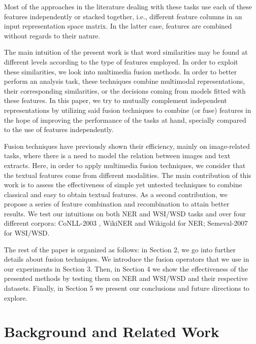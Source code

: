 \documentclass{llncs}
\begin{document}
Most of the approaches in the literature dealing with these tasks use each of these features independently or stacked together, i.e., different feature columns in an input representation space matrix. In the latter case, features are combined without regards to their nature. 

The main intuition of the present work is that word similarities may be found at different levels according to the type of features employed. In order to exploit these similarities, we look into multimedia fusion methods.  In order to better perform an analysis task, these techniques combine multimodal representations, their corresponding similarities, or the decisions coming from models fitted with these features. In this paper, we try to mutually complement independent representations by utilizing said fusion techniques to combine (or fuse) features in the hope of improving the performance of the tasks at hand, specially compared to the use of features independently. 

Fusion techniques have previously shown their efficiency, mainly on image-related tasks, where there is a need to model the relation  between images and text extracts.
%
%
Here, in order to apply multimedia fusion techniques, we consider that the textual features  come from different modalities. The main contribution of this work is to assess the effectiveness of simple yet untested techniques to combine classical and easy to obtain textual features. As a second contribution, we propose a series of feature combination and recombination to attain better results. We test our intuitions on both NER and WSI/WSD tasks and over four different corpora: CoNLL-2003 \cite{SangM03}, WikiNER and Wikigold \cite{Balasuriya2009} for NER; Semeval-2007 \cite{Agirre2007} for WSI/WSD.

The rest of the paper is organized as follows: in Section 2, we go into further details about fusion techniques. 
We introduce the fusion operators that we use in our experiments in Section 3. Then, in Section 4 we show the effectiveness of the presented methods by testing them on NER and WSI/WSD and their respective datasets. Finally, in Section 5 we present our conclusions and future directions to explore.

\section{Background and Related Work}
 
\end{document}
